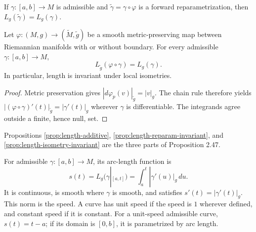 \begin{proposition}
\label{prop:length-reparam-invariant}




If $\gamma:[a,b]\to M$ is admissible and $\widetilde\gamma=\gamma\circ\varphi$ is a forward reparametrization, then $L_g(\widetilde\gamma)=L_g(\gamma)$.
\end{proposition}

\begin{proposition}
\label{prop:length-isometry-invariant}





Let $\varphi:(M,g)\to(\widetilde M,\widetilde g)$ be a smooth metric-preserving map between Riemannian manifolds with or without boundary. For every admissible $\gamma:[a,b]\to M$,
\[
L_{\widetilde g}(\varphi\circ\gamma)=L_g(\gamma).
\]
In particular, length is invariant under local isometries.
\end{proposition}
\begin{proof}

\sketch Metric preservation gives $|d\varphi_p(v)|_{\widetilde g}=|v|_g$. The chain rule therefore yields $|(\varphi\circ\gamma)'(t)|_{\widetilde g}=|\gamma'(t)|_g$ wherever $\gamma$ is differentiable. The integrands agree outside a finite, hence null, set.
\end{proof}

Propositions \ref{prop:length-additive}, \ref{prop:length-reparam-invariant}, and \ref{prop:length-isometry-invariant} are the three parts of Proposition 2.47.

For admissible $\gamma:[a,b]\to M$, its arc-length function is
\[
s(t)=L_g(\gamma|_{[a,t]})=\int_a^t|\gamma'(u)|_g\,du.
\]
It is continuous, is smooth where $\gamma$ is smooth, and satisfies $s'(t)=|\gamma'(t)|_g$. This norm is the speed. A curve has unit speed if the speed is $1$ wherever defined, and constant speed if it is constant. For a unit-speed admissible curve, $s(t)=t-a$; if its domain is $[0,b]$, it is parametrized by arc length.

